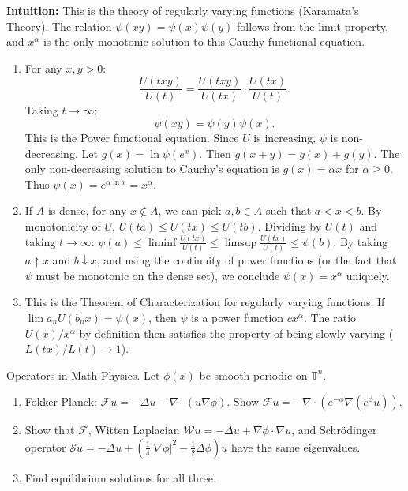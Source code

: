 \begin{solution}
\textbf{Intuition:} This is the theory of regularly varying functions (Karamata's Theory). The relation $\psi(xy) = \psi(x)\psi(y)$ follows from the limit property, and $x^\alpha$ is the only monotonic solution to this Cauchy functional equation.

\begin{enumerate}
    \item[(a)] For any $x, y > 0$:
    \[ \frac{U(txy)}{U(t)} = \frac{U(txy)}{U(tx)} \cdot \frac{U(tx)}{U(t)}. \]
    Taking $t \to \infty$:
    \[ \psi(xy) = \psi(y) \psi(x). \]
    This is the Power functional equation. Since $U$ is increasing, $\psi$ is non-decreasing.
    Let $g(x) = \ln \psi(e^{x})$. Then $g(x+y) = g(x) + g(y)$.
    The only non-decreasing solution to Cauchy's equation is $g(x) = \alpha x$ for $\alpha \geq 0$.
    Thus $\psi(x) = e^{\alpha \ln x} = x^\alpha$.
    
    \item[(b)] If $A$ is dense, for any $x \notin A$, we can pick $a, b \in A$ such that $a < x < b$.
    By monotonicity of $U$, $U(ta) \leq U(tx) \leq U(tb)$.
    Dividing by $U(t)$ and taking $t \to \infty$:
    $\psi(a) \leq \liminf \frac{U(tx)}{U(t)} \leq \limsup \frac{U(tx)}{U(t)} \leq \psi(b)$.
    By taking $a \uparrow x$ and $b \downarrow x$, and using the continuity of power functions (or the fact that $\psi$ must be monotonic on the dense set), we conclude $\psi(x) = x^\alpha$ uniquely.
    
    \item[(c)] This is the Theorem of Characterization for regularly varying functions. If $\lim a_n U(b_n x) = \psi(x)$, then $\psi$ is a power function $c x^\alpha$. The ratio $U(x)/x^\alpha$ by definition then satisfies the property of being slowly varying ($L(tx)/L(t) \to 1$).
\end{enumerate}
\end{solution}

\begin{exercise}
\label{applied:2013:8}
Operators in Math Physics. Let $\phi(x)$ be smooth periodic on $\mathbb{T}^n$.
\begin{enumerate}
    \item[(i)] Fokker-Planck: $\mathcal{F}u = -\Delta u - \nabla \cdot (u \nabla \phi)$. Show $\mathcal{F}u = -\nabla \cdot (e^{-\phi} \nabla (e^\phi u))$.
    \item[(ii)] Show that $\mathcal{F}$, Witten Laplacian $\mathcal{W}u = -\Delta u + \nabla \phi \cdot \nabla u$, and Schrödinger operator $\mathcal{S}u = -\Delta u + (\frac{1}{4}|\nabla \phi|^2 - \frac{1}{2}\Delta \phi)u$ have the same eigenvalues.
    \item[(iii)] Find equilibrium solutions for all three.
\end{enumerate}
\end{exercise}

